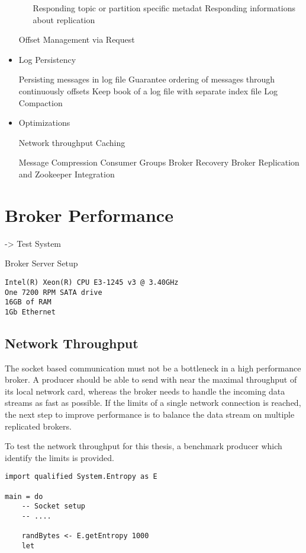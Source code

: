 \begin{itemize}
\begin{itemize}
        \fail Responding topic or partition specific metadat
        \fail Responding informations about replication 
    \end{itemize}
    \fail Offset Management via Request
    \item Log Persistency
    \begin{itemize}
        \tick Persisting messages in log file
        \tick Guarantee ordering of messages through continuously offsets
        \tick Keep book of a log file with separate index file 
        \fail Log Compaction 
    \end{itemize}
    \item Optimizations 
    \begin{itemize}
        \tick Network throughput 
        \tick Caching
    \end{itemize}
    \fail Message Compression 
    \fail Consumer Groups 
    \fail Broker Recovery
    \fail Broker Replication and Zookeeper Integration
   \end{itemize}

\section{Broker Performance}
-> Test System

Broker Server Setup
\begin{verbatim}
Intel(R) Xeon(R) CPU E3-1245 v3 @ 3.40GHz
One 7200 RPM SATA drive
16GB of RAM
1Gb Ethernet 
\end{verbatim}

\subsection{Network Throughput}
The socket based communication must not be a bottleneck in a high performance
broker. A producer should be able to send with near the maximal throughput of
its local network card, whereas the broker needs to handle the incoming data
streams as fast as possible. If the limits of a single network connection is
reached, the next step to improve performance is to balance the data
stream on multiple replicated brokers.

To test the network throughput for this thesis, a benchmark producer
which identify the limits is provided.

\begin{lstlisting}
import qualified System.Entropy as E

main = do 
    -- Socket setup 
    -- ....

    randBytes <- E.getEntropy 1000
    let
\end{lstlisting}


